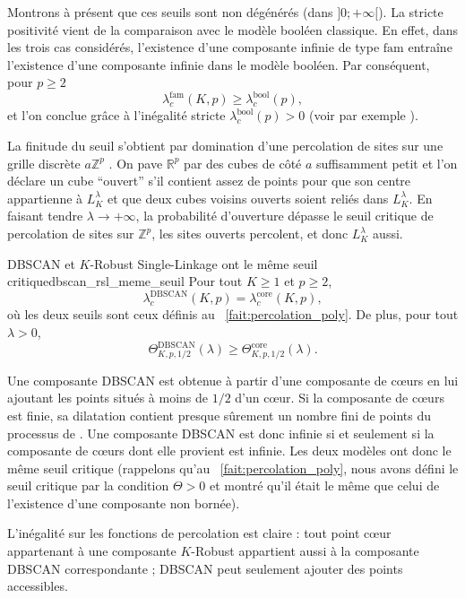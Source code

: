 \begin{Preuve}
Montrons à présent que ces seuils sont non dégénérés (dans $]0 ; + \infty[$). La stricte positivité vient de la comparaison avec le modèle booléen classique. En effet, dans les trois cas considérés, l'existence d'une composante infinie de type $\mathrm{fam}$ entraîne l'existence d'une composante infinie dans le modèle booléen. Par conséquent, pour $p\ge 2$
\[
\lambda^{\mathrm{fam}}_{c}(K,p)
\geq
\lambda^{\mathrm{bool}}_{c}(p),
\]
et l'on conclue grâce à l'inégalité stricte $\lambda^{\mathrm{bool}}_{c}(p)>0$ (voir par exemple \cite{penrose2003,MeesterRoy}).

La finitude du seuil s'obtient par domination d'une percolation de sites \cite{Percolation2006} sur une grille discrète $a \mathbb Z^p$ . On pave $\mathbb R^p$ par des cubes de côté $a$ suffisamment petit et l’on déclare un cube ``ouvert'' s’il contient assez de points pour que son centre appartienne à $L_K^\lambda$ et que deux cubes voisins ouverts soient reliés dans $L_K^\lambda$. En faisant tendre $\lambda \to +\infty$, la probabilité d’ouverture dépasse le seuil critique de percolation de sites sur $\mathbb Z^p$, les sites ouverts percolent, et donc $L_K^\lambda$ aussi.

\end{Preuve}

\begin{Fait}{DBSCAN et $K$-Robust Single-Linkage ont le même seuil critique}{dbscan_rsl_meme_seuil}
Pour tout $K\geq 1$ et $p\geq 2$,
\[
\lambda^{\mathrm{DBSCAN}}_{c}(K,p)
=
\lambda^{\mathrm{core}}_{c}(K,p),
\]
où les deux seuils sont ceux définis au \Fact~\ref{fait:percolation_poly}. 
De plus, pour tout $\lambda>0$,
\[
\Theta^{\mathrm{DBSCAN}}_{K,p,1/2}(\lambda)
\geq
\Theta^{\mathrm{core}}_{K,p,1/2}(\lambda).
\]
\end{Fait}

\begin{Preuve}
Une composante DBSCAN est obtenue à partir d'une composante de cœurs en lui ajoutant les points situés à moins de $1/2$ d'un cœur. Si la composante de cœurs est finie, sa dilatation contient presque sûrement un nombre fini de points du processus de . Une composante DBSCAN est donc infinie si et seulement si la composante de cœurs dont elle provient est infinie. Les deux modèles ont donc le même seuil critique (rappelons qu'au \Fact~\ref{fait:percolation_poly}, nous avons défini le seuil critique par la condition $\Theta>0$ et montré qu'il était le même que celui de l'existence d'une composante non bornée).

L'inégalité sur les fonctions de percolation est claire : tout point cœur appartenant à une composante $K$-Robust appartient aussi à la composante DBSCAN correspondante ; DBSCAN peut seulement ajouter des points accessibles.
\end{Preuve}


